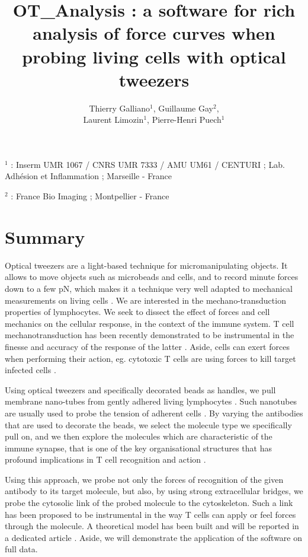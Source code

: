 \documentclass[a4paper]{article}
\title{OT_Analysis : a software for rich analysis of force
	curves when probing living cells with optical tweezers }
\author{Thierry Galliano$^1$, Guillaume Gay$^2$,\\ Laurent Limozin$^1$, Pierre-Henri Puech$^1$}
\date{}
\begin{document}
\maketitle

\noindent $^1$ : Inserm UMR 1067 / CNRS UMR 7333 / AMU UM61 / CENTURI  ; Lab. Adhésion et Inflammation ; Marseille - France

\noindent $^2$ : France Bio Imaging ; Montpellier - France

\section{Summary}\label{summary}

Optical tweezers are a light-based technique for micromanipulating
objects. It allows to move objects such as microbeads and cells, and to record minute forces down to a few pN, which makes it a technique very well adapted to
mechanical measurements on living cells \cite{gennerich_optical_2017}.
We are interested in the mechano-transduction properties of lymphocytes. We seek to dissect the effect of forces and cell mechanics on the
cellular response, in the context of the immune system. T cell mechanotransduction has been
recently demonstrated to be instrumental in the finesse and accuracy of the
response of the latter \cite{puech_mechanotransduction_2021}. Aside,
cells can exert forces when performing their action, eg. cytotoxic T
cells are using forces to kill target infected cells
\cite{basu_cytotoxic_2016}.

Using optical tweezers and specifically decorated beads as handles, we
pull membrane nano-tubes from gently adhered living lymphocytes
\cite{sadoun_dissecting_2020}. Such nanotubes are usually used to
probe the tension of adherent cells \cite{diz-munoz_control_2010}. By
varying the antibodies that are used to decorate the beads, we select
the molecule type we specifically pull on, and we then explore the
molecules which are characteristic of the immune synapse, that is one of
the key organisational structures that has profound implications in T
cell recognition and action \cite{baldari_immune_2017}.

Using this approach, we probe not only the forces of recognition of the
given antibody to its target molecule, but also, by using strong
extracellular bridges, we probe the cytosolic link of the probed molecule
to the cytoskeleton. Such a link has been proposed to be instrumental in
the way T cells can apply or feel forces through the molecule. A
theoretical model has been built and will be reported in a dedicated
article \cite{manca_membrane_2022}. Aside, we will demonstrate the application of the software on full data.
\end{document}
